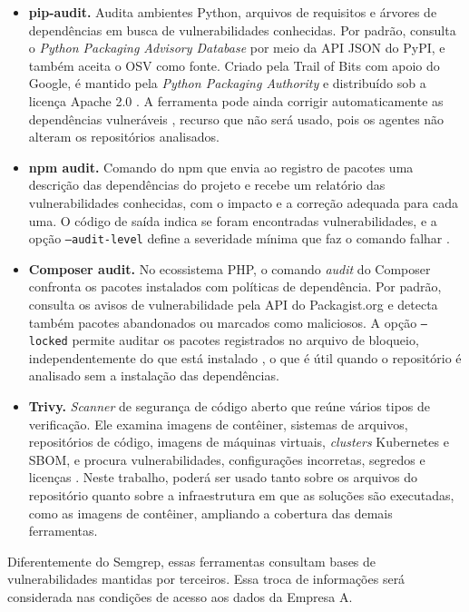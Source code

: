 \begin{itemize}
\item \textbf{pip-audit.} Audita ambientes Python, arquivos de requisitos e árvores de dependências em busca de vulnerabilidades conhecidas. Por padrão, consulta o \textit{Python Packaging Advisory Database} por meio da API JSON do PyPI, e também aceita o OSV como fonte. Criado pela Trail of Bits com apoio do Google, é mantido pela \textit{Python Packaging Authority} e distribuído sob a licença Apache 2.0 \cite{pipAuditDocs}. A ferramenta pode ainda corrigir automaticamente as dependências vulneráveis \cite{pipAuditDocs}, recurso que não será usado, pois os agentes não alteram os repositórios analisados.
\item \textbf{npm audit.} Comando do npm que envia ao registro de pacotes uma descrição das dependências do projeto e recebe um relatório das vulnerabilidades conhecidas, com o impacto e a correção adequada para cada uma. O código de saída indica se foram encontradas vulnerabilidades, e a opção \texttt{--audit-level} define a severidade mínima que faz o comando falhar \cite{npmAuditDocs}.
\item \textbf{Composer audit.} No ecossistema PHP, o comando \textit{audit} do Composer confronta os pacotes instalados com políticas de dependência. Por padrão, consulta os avisos de vulnerabilidade pela API do Packagist.org e detecta também pacotes abandonados ou marcados como maliciosos. A opção \texttt{--locked} permite auditar os pacotes registrados no arquivo de bloqueio, independentemente do que está instalado \cite{composerAuditDocs}, o que é útil quando o repositório é analisado sem a instalação das dependências.
\item \textbf{Trivy.} \textit{Scanner} de segurança de código aberto que reúne vários tipos de verificação. Ele examina imagens de contêiner, sistemas de arquivos, repositórios de código, imagens de máquinas virtuais, \textit{clusters} Kubernetes e SBOM, e procura vulnerabilidades, configurações incorretas, segredos e licenças \cite{trivyDocs}. %
Neste trabalho, poderá ser usado tanto sobre os arquivos do repositório quanto sobre a infraestrutura em que as soluções são executadas, como as imagens de contêiner, ampliando a cobertura das demais ferramentas.
\end{itemize}

Diferentemente do Semgrep, essas ferramentas consultam bases de vulnerabilidades mantidas por terceiros. Essa troca de informações será considerada nas condições de acesso aos dados da Empresa A.

